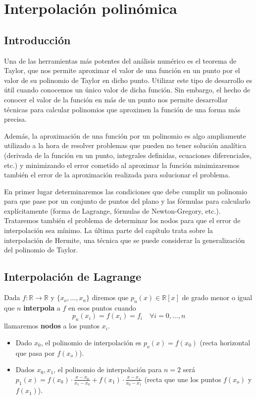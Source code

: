 \chapter{Interpolación polinómica}
\section{Introducción}
Una de las herramientas más potentes del análisis numérico es el teorema de Taylor, que nos permite aproximar el valor de una función en un punto por el valor de su polinomio de Taylor en dicho punto. Utilizar este tipo de desarrollo es útil cuando conocemos un único valor de dicha función. Sin embargo, el hecho de conocer el valor de la función en más de un punto nos permite desarrollar técnicas para calcular polinomios que aproximen la función de una forma más precisa. 

Además, la aproximación de una función por un polinomio es algo ampliamente utilizado a la hora de resolver problemas que pueden no tener solución analítica (derivada de la función en un punto, integrales definidas, ecuaciones diferenciales, etc.) y minimizando el error cometido al aproximar la función minimizaremos también el error de la aproximación realizada para solucionar el problema.

En primer lugar determinaremos las condiciones que debe cumplir un polinomio para que pase por un conjunto de puntos del plano y las fórmulas para calcularlo explícitamente (forma de Lagrange, fórmulas de Newton-Gregory, etc.). Trataremos también el problema de determinar los nodos para que el error de interpolación sea mínimo. La última parte del capítulo trata sobre la interpolación de Hermite, una técnica que se puede considerar la generalización del polinomio de Taylor.
        \section{Interpolación de Lagrange}
        
        \begin{defin}
        Dada $f: \mathbb{R} \longrightarrow \mathbb{R}$ y $\{x_o, \ldots, x_n\}$ diremos que $p_n(x) \in \mathbb{R}[x]$ de grado menor o igual que $n$ \textbf{interpola} a $f$ en esos puntos cuando 
        $$p_n(x_i)=f(x_i)=f_i \quad \forall i = 0, \ldots, n$$
        llamaremos \textbf{nodos} a los puntos $x_i$.
        \end{defin}
        \begin{ejes}\:
        \vspace{-3mm}
        \begin{itemize}
            \item Dado $x_0$, el polinomio de interpolación es $p_o(x)=f(x_0)$ (recta horizontal que pasa por $f(x_o)$).
            \item Dados $x_0,x_1$, el polinomio de interpolación para $n=2$ será $p_1(x)=f(x_0)\cdot \frac{x-x_0}{x_1-x_0}+f(x_1)\cdot \frac{x-x_1}{x_0-x_1}$ (recta que une los puntos $f(x_o)$ y $f(x_1)$).
            
        \end{itemize}
        \end{ejes}
        
